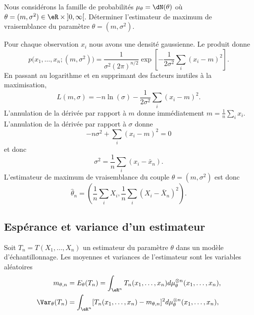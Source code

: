 \begin{example}
	Nous considérons la famille de probabilités \( \mu_{\theta}=\dN(\theta)\) où \( \theta=(m,\sigma^2)\in\eR\times\mathopen] 0 , \infty \mathclose[\). Déterminer l'estimateur de maximum de vraisemblance du paramètre \( \theta=(m,\sigma^2)\).

	Pour chaque observation \( x_i\) nous avons une densité gaussienne. Le produit donne
	\begin{equation}
		p\big( x_1,\ldots,x_n;(m,\sigma^2) \big)=\frac{1}{ \sigma^2(2\pi)^{n/2} }\exp\left[ -\frac{1}{ 2\sigma^2 }\sum_i(x_i-m)^2 \right].
	\end{equation}
	En passant au logarithme et en supprimant des facteurs inutiles à la maximisation,
	\begin{equation}
		L(m,\sigma)=-n\ln(\sigma)-\frac{1}{ 2\sigma^2 }\sum_i(x_i-m)^2.
	\end{equation}
	L'annulation de la dérivée par rapport à \( m\) donne immédiatement \( m=\frac{1}{ n }\sum_i x_i\). L'annulation de la dérivée par rapport à \( \sigma\) donne
	\begin{equation}
		-n\sigma^2+\sum_i(x_i-m)^2=0
	\end{equation}
	et donc
	\begin{equation}
		\sigma^2=\frac{1}{ n }\sum_i(x_i-\bar x_n).
	\end{equation}
	L'estimateur de maximum de vraisemblance du couple \( \theta=(m,\sigma^2)\) est donc
	\begin{equation}
		\hat\theta_n=\left( \frac{1}{ n }\sum_iX_i,\frac{1}{ n }\sum_i(X_i-\bar X_n)^2 \right).
	\end{equation}
\end{example}

\subsection{Espérance et variance d'un estimateur}

Soit \( T_n=T(X_1,\ldots,X_n)\) un estimateur du paramètre \( \theta\) dans un modèle d'échantillonnage. Les moyennes et variances de l'estimateur sont les variables aléatoires
\begin{subequations}
	\begin{align}
		m_{\theta,n}       & =E_{\theta}(T_n)=\int_{\eR^n}T_n(x_1,\ldots,x_n)d\mu_{\theta}^{\otimes n}(x_1,\ldots,x_n),  \\
		\Var_{\theta}(T_n) & =\int_{\eR^n}[T_n(x_1,\ldots,x_n)-m_{\theta,n}]^2d\mu_{\theta}^{\otimes n}(x_1,\ldots,x_n),
	\end{align}
\end{subequations}

